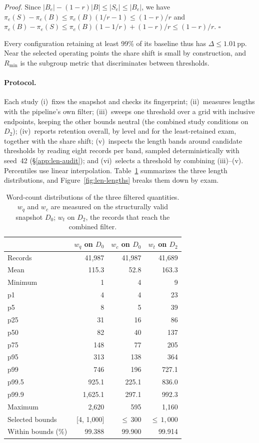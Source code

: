 \noindent\emph{Proof.} Since $|B_e| - (1-r)|B| \le |S_e| \le |B_e|$, we have
$\pi_e(S) - \pi_e(B) \le \pi_e(B)(1/r - 1) \le (1-r)/r$ and
$\pi_e(B) - \pi_e(S) \le \pi_e(B)(1 - 1/r) + (1-r)/r \le (1-r)/r$.
$\square$

\smallskip\noindent Every configuration retaining at least 99\% of its
baseline thus has $\Delta \le 1.01$\,pp. Near the selected operating points
the share shift is small by construction, and $R_{\min}$ is the subgroup
metric that discriminates between thresholds.

\paragraph{Protocol.} Each study (i)~fixes the snapshot and checks its
fingerprint; (ii)~measures lengths with the pipeline's own filter; (iii)~sweeps
one threshold over a grid with inclusive endpoints, keeping the other bounds
neutral (the combined study conditions on $D_2$); (iv)~reports retention
overall, by level and for the least-retained exam, together with the share
shift; (v)~inspects the length bands around candidate thresholds by reading
eight records per band, sampled deterministically with seed~42
(\S\ref{app:len-audit}); and (vi)~selects a threshold by combining (iii)--(v).
Percentiles use linear interpolation. Table~\ref{tab:len-percentiles}
summarizes the three length distributions, and Figure~\ref{fig:len-lengths}
breaks them down by exam.

\begin{table}[t]
\centering
\footnotesize
\setlength{\tabcolsep}{4pt}
\begin{tabular}{@{}lrrr@{}}
\toprule
 & $w_q$ on $D_0$ & $w_c$ on $D_0$ & $w_t$ on $D_2$ \\
\midrule
Records & 41,987 & 41,987 & 41,689 \\
Mean & 115.3 & 52.8 & 163.3 \\
\midrule
Minimum & 1 & 4 & 9 \\
p1 & 4 & 4 & 23 \\
p5 & 8 & 5 & 39 \\
p25 & 31 & 16 & 86 \\
p50 & 82 & 40 & 137 \\
p75 & 148 & 77 & 205 \\
p95 & 313 & 138 & 364 \\
p99 & 746 & 196 & 727.1 \\
p99.5 & 925.1 & 225.1 & 836.0 \\
p99.9 & 1,625.1 & 297.1 & 992.3 \\
Maximum & 2,620 & 595 & 1,160 \\
\midrule
Selected bounds & [4, 1,000] & ${\le}\,300$ & ${\le}\,1{,}000$ \\
Within bounds (\%) & 99.388 & 99.900 & 99.914 \\
\bottomrule
\end{tabular}
\caption{Word-count distributions of the three filtered quantities. $w_q$ and
$w_c$ are measured on the structurally valid snapshot $D_0$; $w_t$ on $D_2$,
the records that reach the combined filter.}
\label{tab:len-percentiles}
\end{table}

